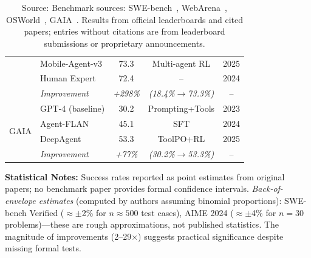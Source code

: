 \documentclass[12pt,a4paper]{report}
\theoremstyle{definition}
\newcommand{\source}[1]{\vspace{-0.5\baselineskip}\caption*{\small Source: #1}}
\begin{document}
\begin{table}[h]
\begin{tabular}{@{}llccc@{}}
& Mobile-Agent-v3 & 73.3 & Multi-agent RL & 2025 \\
& Human Expert & 72.4 & -- & 2024 \\
& \textit{Improvement} & \textit{+298\%} & \textit{(18.4\%$\rightarrow$73.3\%)} & -- \\
\midrule
\multirow{4}{*}{GAIA}
& GPT-4 (baseline) & 30.2 & Prompting+Tools & 2023 \\
& Agent-FLAN & 45.1 & SFT & 2024 \\
& DeepAgent~\cite{li2025deepagent} & 53.3 & ToolPO+RL & 2025 \\
& \textit{Improvement} & \textit{+77\%} & \textit{(30.2\%$\rightarrow$53.3\%)} & -- \\
\bottomrule
\end{tabular}

\vspace{0.2cm}
\footnotesize
\textbf{Statistical Notes:} Success rates reported as point estimates from original papers; no benchmark paper provides formal confidence intervals. \textit{Back-of-envelope estimates} (computed by authors assuming binomial proportions): SWE-bench Verified ($\approx\pm$2\% for $n\approx500$ test cases), AIME 2024 ($\approx\pm$4\% for $n=30$ problems)---these are rough approximations, not published statistics. The magnitude of improvements (2--29$\times$) suggests practical significance despite missing formal tests.

\source{Benchmark sources: SWE-bench~\cite{jimenez2024swebench}, WebArena~\cite{zhou2024webarena}, OSWorld~\cite{xie2024osworld}, GAIA~\cite{mialon2023gaia}. Results from official leaderboards and cited papers; entries without citations are from leaderboard submissions or proprietary announcements.}
\end{table}
\end{document}
